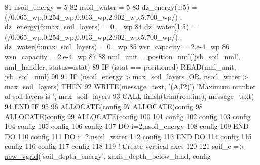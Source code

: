 \begin{DoxyCode}
81     nsoil\_energy   = 5
82     nsoil\_water    = 5
83     dz\_energy(1:5) = (/0.065\_wp,0.254\_wp,0.913\_wp,2.902\_wp,5.700\_wp/) ; dz\_energy(6:max\_soil\_layers) = 0.
      \_wp
84     dz\_water(1:5) = (/0.065\_wp,0.254\_wp,0.913\_wp,2.902\_wp,5.700\_wp/) ; dz\_water(6:max\_soil\_layers) = 0.\_wp
85     wsr\_capacity   = 2.e-4\_wp
86     wsn\_capacity   = 2.e-4\_wp
87 
88     nml\_unit = \hyperlink{namespacemo__jsb__namelist__iface_a4d29dc192b429a0c5f11ecd7d7f637e9}{position\_nml}(\textcolor{stringliteral}{'jsb\_soil\_nml'}, nml\_handler, status=istat)
89     \textcolor{keywordflow}{IF} (istat == positioned) \textcolor{keyword}{READ}(nml\_unit, jsb\_soil\_nml)
90 
91     \textcolor{keywordflow}{IF} (nsoil\_energy > max\_soil\_layers .OR. nsoil\_water > max\_soil\_layers) \textcolor{keywordflow}{THEN}
92       \textcolor{keyword}{WRITE}(message\_text, \textcolor{stringliteral}{'(A,I2)'}) \textcolor{stringliteral}{'Maximum number of soil layers is '}, max\_soil\_layers
93       \textcolor{keyword}{CALL }finish(trim(routine), message\_text)
94 \textcolor{keywordflow}{    END IF}
95 
96     \textcolor{keyword}{ALLOCATE}(config%
97     \textcolor{keyword}{ALLOCATE}(config%
98     \textcolor{keyword}{ALLOCATE}(config%
99     \textcolor{keyword}{ALLOCATE}(config%
100 
101     config%
102     config%
103     config%
104     config%
105     config%
106     config%
107     \textcolor{keywordflow}{DO} i=2,nsoil\_energy
108       config%
109 \textcolor{keywordflow}{    END DO}
110     config%
111     \textcolor{keywordflow}{DO} i=2,nsoil\_water
112       config%
113 \textcolor{keywordflow}{    END DO}
114     config%
115     config%
116     config%
117     config%
118 
119     \textcolor{comment}{! Create vertical axes}
120 
121     soil\_e  => \hyperlink{namespacemo__jsb__grid__class_a9b97575796bec8269c7381e0ffedd2d8}{new\_vgrid}(\textcolor{stringliteral}{'soil\_depth\_energy'}, zaxis\_depth\_below\_land, config%

\end{DoxyCode}

